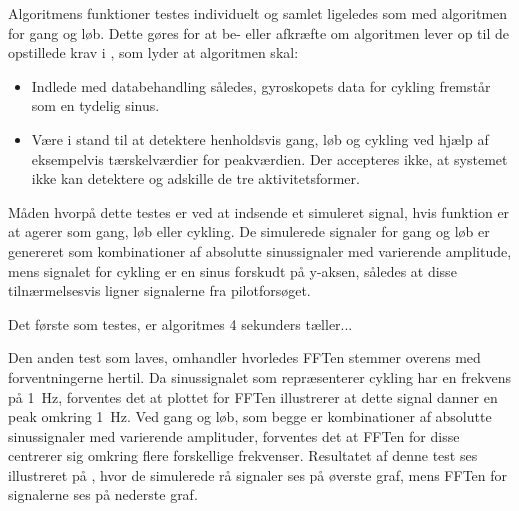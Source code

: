 Algoritmens funktioner testes individuelt og samlet ligeledes som med algoritmen for gang og løb. Dette gøres for at be- eller afkræfte om algoritmen lever op til de opstillede krav i , som lyder at algoritmen skal:
\begin{itemize}
	\item Indlede med databehandling således, %
	gyroskopets data for cykling fremstår som en tydelig sinus. %
	\item Være i stand til at detektere henholdsvis gang, løb og cykling ved hjælp af eksempelvis tærskelværdier for peakværdien. Der accepteres ikke, at systemet ikke kan detektere og adskille de tre aktivitetsformer.
\end{itemize}

Måden hvorpå dette testes er ved at indsende et simuleret signal, hvis funktion er at agerer som gang, løb eller cykling. De simulerede signaler for gang og løb er genereret som kombinationer af absolutte sinussignaler med varierende amplitude, mens signalet for cykling er en sinus forskudt på y-aksen, således at disse tilnærmelsesvis ligner signalerne fra pilotforsøget.

Det første som testes, er algoritmes 4 sekunders tæller... 

Den anden test som laves, omhandler hvorledes FFTen stemmer overens med forventningerne hertil. Da sinussignalet som repræsenterer cykling har en frekvens på 1~Hz, forventes det at plottet for FFTen illustrerer at dette signal danner en peak omkring 1~Hz. Ved gang og løb, som begge er kombinationer af absolutte sinussignaler med varierende amplituder, forventes det at FFTen for disse centrerer sig omkring flere forskellige frekvenser. Resultatet af denne test ses illustreret på , hvor de simulerede rå signaler ses på øverste graf, mens FFTen for signalerne ses på nederste graf.

